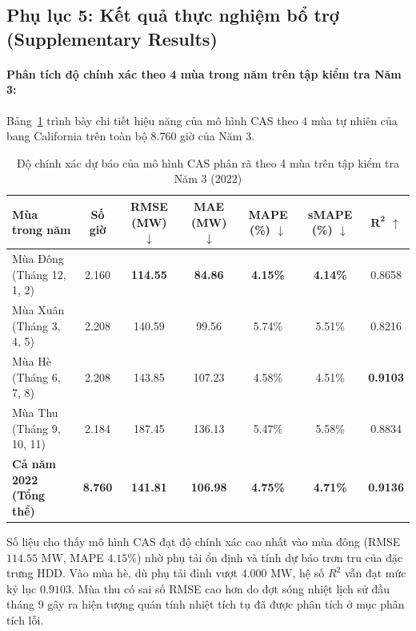 \subsection*{Phụ lục 5: Kết quả thực nghiệm bổ trợ (Supplementary Results)}
\label{subsec:appendix_supplementary}

\paragraph{Phân tích độ chính xác theo 4 mùa trong năm trên tập kiểm tra Năm 3:}
Bảng~\ref{tab:seasonal_breakdown} trình bày chi tiết hiệu năng của mô hình CAS theo 4 mùa tự nhiên của bang California trên toàn bộ 8.760 giờ của Năm 3.

\begin{table}[H]
\centering
\footnotesize
\caption{Độ chính xác dự báo của mô hình CAS phân rã theo 4 mùa trên tập kiểm tra Năm 3 (2022)}
\label{tab:seasonal_breakdown}
\setlength{\tabcolsep}{3.8pt}
\renewcommand{\arraystretch}{1.15}
\begin{tabularx}{\linewidth}{@{} >{\RaggedRight\arraybackslash}X c c c c c c @{}}
\toprule
\textbf{Mùa trong năm} & \textbf{Số giờ} & \textbf{RMSE (MW)} $\downarrow$ & \textbf{MAE (MW)} $\downarrow$ & \textbf{MAPE (\%)} $\downarrow$ & \textbf{sMAPE (\%)} $\downarrow$ & $\mathbf{R^2}$ $\uparrow$ \\
\midrule
Mùa Đông (Tháng 12, 1, 2) & 2.160 & \textbf{114.55} & \textbf{84.86} & \textbf{4.15\%} & \textbf{4.14\%} & 0.8658 \\
Mùa Xuân (Tháng 3, 4, 5) & 2.208 & 140.59 & 99.56 & 5.74\% & 5.51\% & 0.8216 \\
Mùa Hè (Tháng 6, 7, 8) & 2.208 & 143.85 & 107.23 & 4.58\% & 4.51\% & \textbf{0.9103} \\
Mùa Thu (Tháng 9, 10, 11) & 2.184 & 187.45 & 136.13 & 5.47\% & 5.58\% & 0.8834 \\
\midrule
\textbf{Cả năm 2022 (Tổng thể)} & \textbf{8.760} & \textbf{141.81} & \textbf{106.98} & \textbf{4.75\%} & \textbf{4.71\%} & \textbf{0.9136} \\
\bottomrule
\end{tabularx}
\end{table}

Số liệu cho thấy mô hình CAS đạt độ chính xác cao nhất vào mùa đông (RMSE $114.55\text{ MW}$, MAPE $4.15\%$) nhờ phụ tải ổn định và tính dự báo trơn tru của đặc trưng HDD. Vào mùa hè, dù phụ tải đỉnh vượt $4.000\text{ MW}$, hệ số $R^2$ vẫn đạt mức kỷ lục $0.9103$. Mùa thu có sai số RMSE cao hơn do đợt sóng nhiệt lịch sử đầu tháng 9 gây ra hiện tượng quán tính nhiệt tích tụ đã được phân tích ở mục phân tích lỗi.

